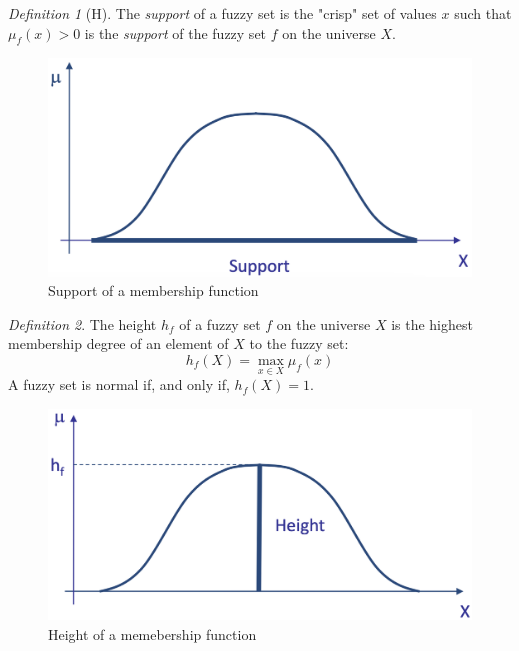 \documentclass[12pt, a4paper]{report}
\theoremstyle{remark}
\newtheorem*{remark}{Definition}
\theoremstyle{definition}
\begin{document}
    \begin{remark}[H]
        The \emph{support} of a fuzzy set is the "crisp" set of values $x$ such that $\mu_f(x)>0$ is the \emph{support} of the fuzzy set
        $f$ on the universe $X$.
    \end{remark}
    \begin{figure}[H]
        \centering
        \includegraphics[width=0.5\linewidth]{images/support.png}
        \caption{Support of a membership function}
    \end{figure}
    \begin{remark}
        The height $h_f$ of a fuzzy set $f$ on the universe $X$ is the highest membership degree of an element of $X$ to the fuzzy set:
        \[h_f(X)=\max_{x \in X}\mu_f(x)\]
        A fuzzy set is normal if, and only if, $h_f(X)=1$.
    \end{remark}
    \begin{figure}[H]
        \centering
        \includegraphics[width=0.5\linewidth]{images/height.png}
        \caption{Height of a memebership function}
    \end{figure}
\end{document}
